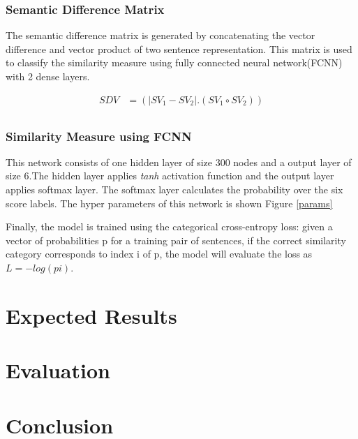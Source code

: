 \documentclass[12pt]{article} %
\begin{document}
	
	\subsubsection*{Semantic Difference Matrix}
	The semantic difference matrix is generated by concatenating the vector difference and vector product of two sentence representation. This  matrix is used to classify the similarity measure using fully connected neural network(FCNN) with 2 dense layers. 
	
		\begin{align*} 
			SDV & =(|SV_{1}- SV_{2}|.(SV_{1} \circ SV_{2})) \\
		\end{align*}
	
	\subsubsection*{Similarity Measure using FCNN}
	
	 This network consists of one hidden layer of size 300 nodes and a output layer of size 6.The hidden layer applies \textit{tanh} activation function and the output layer applies softmax layer. The softmax layer calculates the probability over the six score labels. The hyper parameters of this network is shown Figure \ref{params}
	 
	 Finally, the model is trained using the categorical cross-entropy loss: given a vector of probabilities p for a training pair of sentences, if the correct similarity category corresponds to index i of p, the model will evaluate the loss as $L = − log(pi)$.
	 

	\section{Expected Results}
	
	\section{Evaluation}
    
    
	\section{Conclusion}
   

   
\end{document}
